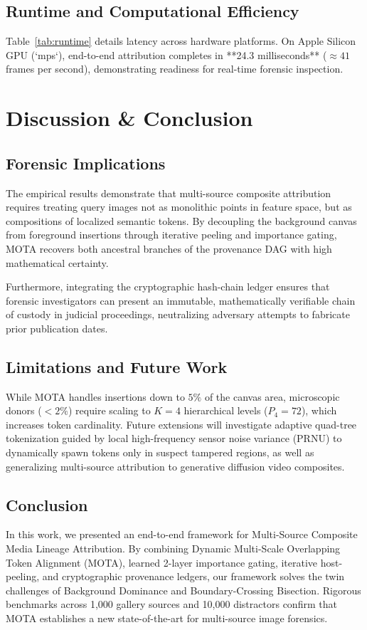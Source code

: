 \documentclass[journal]{IEEEtran}
\begin{document}
\subsection{Runtime and Computational Efficiency}
Table~\ref{tab:runtime} details latency across hardware platforms. On Apple Silicon GPU (`mps`), end-to-end attribution completes in **24.3 milliseconds** ($\approx 41$ frames per second), demonstrating readiness for real-time forensic inspection.

\section{Discussion \& Conclusion}

\subsection{Forensic Implications}
The empirical results demonstrate that multi-source composite attribution requires treating query images not as monolithic points in feature space, but as compositions of localized semantic tokens. By decoupling the background canvas from foreground insertions through iterative peeling and importance gating, MOTA recovers both ancestral branches of the provenance DAG with high mathematical certainty.

Furthermore, integrating the cryptographic hash-chain ledger ensures that forensic investigators can present an immutable, mathematically verifiable chain of custody in judicial proceedings, neutralizing adversary attempts to fabricate prior publication dates.

\subsection{Limitations and Future Work}
While MOTA handles insertions down to $5\%$ of the canvas area, microscopic donors ($<2\%$) require scaling to $K=4$ hierarchical levels ($P_4 = 72$), which increases token cardinality. Future extensions will investigate adaptive quad-tree tokenization guided by local high-frequency sensor noise variance (PRNU) to dynamically spawn tokens only in suspect tampered regions, as well as generalizing multi-source attribution to generative diffusion video composites.

\subsection{Conclusion}
In this work, we presented an end-to-end framework for Multi-Source Composite Media Lineage Attribution. By combining Dynamic Multi-Scale Overlapping Token Alignment (MOTA), learned 2-layer importance gating, iterative host-peeling, and cryptographic provenance ledgers, our framework solves the twin challenges of Background Dominance and Boundary-Crossing Bisection. Rigorous benchmarks across 1,000 gallery sources and 10,000 distractors confirm that MOTA establishes a new state-of-the-art for multi-source image forensics.
\end{document}
